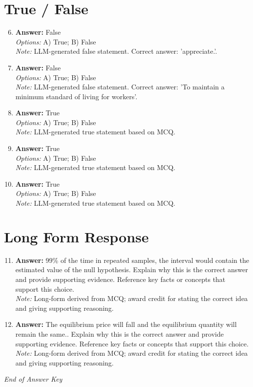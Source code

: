 \documentclass[12pt]{article}
\begin{document}
\section*{True / False}
\begin{enumerate}[label=\arabic*.]
\setcounter{enumi}{5}
\item \textbf{Answer:} False
\\ \textit{Options:} A) True; B) False
\\ \textit{Note:} LLM-generated false statement. Correct answer: 'appreciate.'.
\item \textbf{Answer:} False
\\ \textit{Options:} A) True; B) False
\\ \textit{Note:} LLM-generated false statement. Correct answer: 'To maintain a minimum standard of living for workers'.
\item \textbf{Answer:} True
\\ \textit{Options:} A) True; B) False
\\ \textit{Note:} LLM-generated true statement based on MCQ.
\item \textbf{Answer:} True
\\ \textit{Options:} A) True; B) False
\\ \textit{Note:} LLM-generated true statement based on MCQ.
\item \textbf{Answer:} True
\\ \textit{Options:} A) True; B) False
\\ \textit{Note:} LLM-generated true statement based on MCQ.
\end{enumerate}

\section*{Long Form Response}
\begin{enumerate}[label=\arabic*.]
\setcounter{enumi}{10}
\item \textbf{Answer:} 99\% of the time in repeated samples, the interval would contain the estimated value of the null hypothesis. Explain why this is the correct answer and provide supporting evidence. Reference key facts or concepts that support this choice.
\\ \textit{Note:} Long-form derived from MCQ; award credit for stating the correct idea and giving supporting reasoning.
\item \textbf{Answer:} The equilibrium price will fall and the equilibrium quantity will remain the same.. Explain why this is the correct answer and provide supporting evidence. Reference key facts or concepts that support this choice.
\\ \textit{Note:} Long-form derived from MCQ; award credit for stating the correct idea and giving supporting reasoning.
\end{enumerate}

\vfill
\noindent\textit{End of Answer Key}
\end{document}
